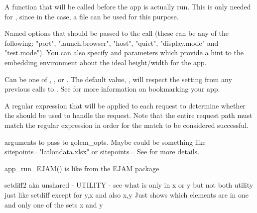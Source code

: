 \documentclass[a4paper]{book}
\begin{document}
\begin{Arguments}
\begin{ldescription}
\item[\code{onStart}] A function that will be called before the app is actually run.
This is only needed for , since in the 
case, a  file can be used for this purpose.

\item[\code{options}] Named options that should be passed to the  call
(these can be any of the following: "port", "launch.browser", "host", "quiet",
"display.mode" and "test.mode"). You can also specify  and
 parameters which provide a hint to the embedding environment
about the ideal height/width for the app.

\item[\code{enableBookmarking}] Can be one of , , or
. The default value, , will respect the setting from
any previous calls to  . See 
for more information on bookmarking your app.

\item[\code{uiPattern}] A regular expression that will be applied to each 
request to determine whether the  should be used to handle the
request. Note that the entire request path must match the regular
expression in order for the match to be considered successful.

\item[\code{...}] arguments to pass to golem\_opts. Maybe could be something like sitepoints="latlondata.xlsx" or sitepoints=
See  for more details.
\end{ldescription}
\end{Arguments}
%
\begin{Details}\relax
app\_run\_EJAM()                 is like  from the EJAM package
\end{Details}
%
\begin{Description}\relax
setdiff2 aka unshared - UTILITY - see what is only in x or y but not both
utility just like setdiff except for y,x and also x,y
Just shows which elements are in one and only one of the sets x and y
\end{Description}
\end{document}
